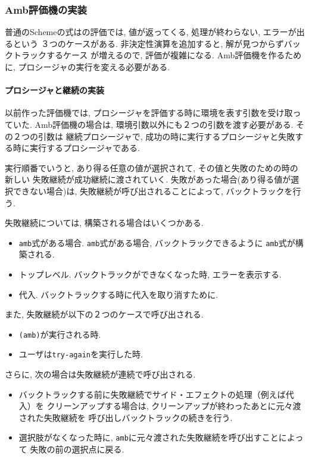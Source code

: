 \setcounter{subsubsection}{2}
\subsubsection{Amb評価機の実装}
普通のSchemeの式はの評価では, 値が返ってくる, 処理が終わらない, エラーが出るという
３つのケースがある. 非決定性演算を追加すると, 解が見つからずバックトラックするケース
が増えるので, 評価が複雑になる.
Amb評価機を作るために, プロシージャの実行を変える必要がある.

\paragraph{プロシージャと継続の実装}
以前作った評価機では, プロシージャを評価する時に環境を表す引数を受け取っていた.
Amb評価機の場合は, 環境引数以外にも２つの引数を渡す必要がある. その２つの引数は
継続プロシージャで, 成功の時に実行するプロシージャと失敗する時に実行するプロシージャである.

実行順番でいうと, あり得る任意の値が選択されて, その値と失敗のための時の新しい
失敗継続が成功継続に渡されていく. 失敗があった場合(あり得る値が選択できない場合)は,
失敗継続が呼び出されることによって, バックトラックを行う.

失敗継続については, 構築される場合はいくつかある.

\begin{itemize}
\item \lstinline{amb}式がある場合. \lstinline{amb}式がある場合, バックトラックできるように
  \lstinline{amb}式が構築される.
\item トップレベル. バックトラックができなくなった時, エラーを表示する.
\item 代入. バックトラックする時に代入を取り消すために.
\end{itemize}

また, 失敗継続が以下の２つのケースで呼び出される.

\begin{itemize}
\item \lstinline{(amb)}が実行される時.
\item ユーザは\lstinline{try-again}を実行した時.
\end{itemize}

さらに, 次の場合は失敗継続が連続で呼び出される.

\begin{itemize}
\item バックトラックする前に失敗継続でサイド・エフェクトの処理（例えば代入）を
  クリーンアップする場合は, クリーンアップが終わったあとに元々渡された失敗継続を
  呼び出しバックトラックの続きを行う.
\item 選択肢がなくなった時に, \lstinline{amb}に元々渡された失敗継続を呼び出すことによって
  失敗の前の選択点に戻る.
\end{itemize}
